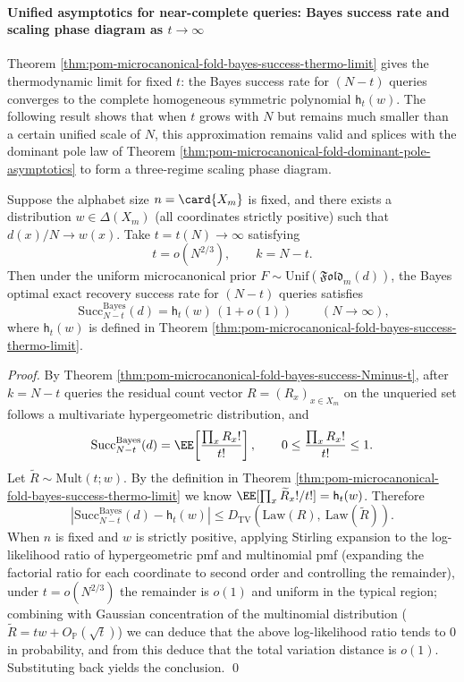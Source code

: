 \paragraph{Unified asymptotics for near-complete queries: Bayes success rate and scaling phase diagram as \texorpdfstring{$t\to\infty$}{t->infty}}
Theorem \ref{thm:pom-microcanonical-fold-bayes-success-thermo-limit} gives the thermodynamic limit for fixed \(t\):
the Bayes success rate for \((N-t)\) queries converges to the complete homogeneous symmetric polynomial \(\mathsf{h}_t(w)\).
The following result shows that when \(t\) grows with \(N\) but remains much smaller than a certain unified scale of \(N\),
this approximation remains valid and splices with the dominant pole law of Theorem \ref{thm:pom-microcanonical-fold-dominant-pole-asymptotics} to form a three-regime scaling phase diagram.

\begin{theorem}\label{thm:pom-microcanonical-fold-bayes-success-near-complete-uniform}
Suppose the alphabet size \(n=\card{X_m}\) is fixed, and there exists a distribution \(w\in\Delta(X_m)\) (all coordinates strictly positive) such that \(d(x)/N\to w(x)\).
Take \(t=t(N)\to\infty\) satisfying
\[
t=o(N^{2/3}),
\qquad
k=N-t.
\]
Then under the uniform microcanonical prior \(F\sim\mathrm{Unif}(\mathfrak{Fold}_m(d))\), the Bayes optimal exact recovery success rate for \((N-t)\) queries satisfies
\[
\boxed{\;
\mathrm{Succ}^{\mathrm{Bayes}}_{N-t}(d)
=\mathsf{h}_t(w)\,(1+o(1))\;}
\qquad(N\to\infty),
\]
where \(\mathsf{h}_t(w)\) is defined in Theorem \ref{thm:pom-microcanonical-fold-bayes-success-thermo-limit}.
\end{theorem}
\begin{proof}
By Theorem \ref{thm:pom-microcanonical-fold-bayes-success-Nminus-t},
after \(k=N-t\) queries the residual count vector \(R=(R_x)_{x\in X_m}\) on the unqueried set follows a multivariate hypergeometric distribution,
and
\[
\mathrm{Succ}^{\mathrm{Bayes}}_{N-t}(d)=\EE\!\left[\frac{\prod_x R_x!}{t!}\right],
\qquad
0\le \frac{\prod_x R_x!}{t!}\le 1.
\]
Let \(\widetilde R\sim\mathrm{Mult}(t;w)\).
By the definition in Theorem \ref{thm:pom-microcanonical-fold-bayes-success-thermo-limit} we know
\(
\EE[\prod_x \widetilde R_x!/t!]=\mathsf{h}_t(w)
\).
Therefore
\[
\left|\mathrm{Succ}^{\mathrm{Bayes}}_{N-t}(d)-\mathsf{h}_t(w)\right|
\le D_{\mathrm{TV}}\!\left(\mathrm{Law}(R),\ \mathrm{Law}(\widetilde R)\right).
\]
When \(n\) is fixed and \(w\) is strictly positive,
applying Stirling expansion to the log-likelihood ratio of hypergeometric pmf and multinomial pmf (expanding the factorial ratio for each coordinate to second order and controlling the remainder),
under \(t=o(N^{2/3})\) the remainder is \(o(1)\) and uniform in the typical region;
combining with Gaussian concentration of the multinomial distribution (\(\widetilde R=tw+O_{\mathbb{P}}(\sqrt t)\)) we can deduce that the above log-likelihood ratio tends to \(0\) in probability, and from this deduce that the total variation distance is \(o(1)\).
Substituting back yields the conclusion. \qed
\end{proof}

